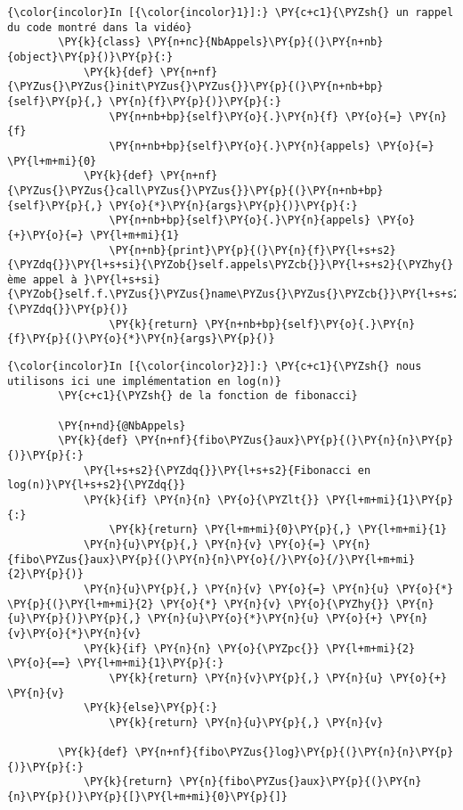     \begin{Verbatim}[commandchars=\\\{\},frame=single,framerule=0.3mm,rulecolor=\color{cellframecolor}]
{\color{incolor}In [{\color{incolor}1}]:} \PY{c+c1}{\PYZsh{} un rappel du code montré dans la vidéo}
        \PY{k}{class} \PY{n+nc}{NbAppels}\PY{p}{(}\PY{n+nb}{object}\PY{p}{)}\PY{p}{:}
            \PY{k}{def} \PY{n+nf}{\PYZus{}\PYZus{}init\PYZus{}\PYZus{}}\PY{p}{(}\PY{n+nb+bp}{self}\PY{p}{,} \PY{n}{f}\PY{p}{)}\PY{p}{:}
                \PY{n+nb+bp}{self}\PY{o}{.}\PY{n}{f} \PY{o}{=} \PY{n}{f}
                \PY{n+nb+bp}{self}\PY{o}{.}\PY{n}{appels} \PY{o}{=} \PY{l+m+mi}{0}
            \PY{k}{def} \PY{n+nf}{\PYZus{}\PYZus{}call\PYZus{}\PYZus{}}\PY{p}{(}\PY{n+nb+bp}{self}\PY{p}{,} \PY{o}{*}\PY{n}{args}\PY{p}{)}\PY{p}{:}
                \PY{n+nb+bp}{self}\PY{o}{.}\PY{n}{appels} \PY{o}{+}\PY{o}{=} \PY{l+m+mi}{1}
                \PY{n+nb}{print}\PY{p}{(}\PY{n}{f}\PY{l+s+s2}{\PYZdq{}}\PY{l+s+si}{\PYZob{}self.appels\PYZcb{}}\PY{l+s+s2}{\PYZhy{}ème appel à }\PY{l+s+si}{\PYZob{}self.f.\PYZus{}\PYZus{}name\PYZus{}\PYZus{}\PYZcb{}}\PY{l+s+s2}{\PYZdq{}}\PY{p}{)}
                \PY{k}{return} \PY{n+nb+bp}{self}\PY{o}{.}\PY{n}{f}\PY{p}{(}\PY{o}{*}\PY{n}{args}\PY{p}{)}
\end{Verbatim}


    \begin{Verbatim}[commandchars=\\\{\},frame=single,framerule=0.3mm,rulecolor=\color{cellframecolor}]
{\color{incolor}In [{\color{incolor}2}]:} \PY{c+c1}{\PYZsh{} nous utilisons ici une implémentation en log(n)}
        \PY{c+c1}{\PYZsh{} de la fonction de fibonacci}
        
        \PY{n+nd}{@NbAppels}
        \PY{k}{def} \PY{n+nf}{fibo\PYZus{}aux}\PY{p}{(}\PY{n}{n}\PY{p}{)}\PY{p}{:}
            \PY{l+s+s2}{\PYZdq{}}\PY{l+s+s2}{Fibonacci en log(n)}\PY{l+s+s2}{\PYZdq{}}
            \PY{k}{if} \PY{n}{n} \PY{o}{\PYZlt{}} \PY{l+m+mi}{1}\PY{p}{:}
                \PY{k}{return} \PY{l+m+mi}{0}\PY{p}{,} \PY{l+m+mi}{1}
            \PY{n}{u}\PY{p}{,} \PY{n}{v} \PY{o}{=} \PY{n}{fibo\PYZus{}aux}\PY{p}{(}\PY{n}{n}\PY{o}{/}\PY{o}{/}\PY{l+m+mi}{2}\PY{p}{)}
            \PY{n}{u}\PY{p}{,} \PY{n}{v} \PY{o}{=} \PY{n}{u} \PY{o}{*} \PY{p}{(}\PY{l+m+mi}{2} \PY{o}{*} \PY{n}{v} \PY{o}{\PYZhy{}} \PY{n}{u}\PY{p}{)}\PY{p}{,} \PY{n}{u}\PY{o}{*}\PY{n}{u} \PY{o}{+} \PY{n}{v}\PY{o}{*}\PY{n}{v}
            \PY{k}{if} \PY{n}{n} \PY{o}{\PYZpc{}} \PY{l+m+mi}{2} \PY{o}{==} \PY{l+m+mi}{1}\PY{p}{:}
                \PY{k}{return} \PY{n}{v}\PY{p}{,} \PY{n}{u} \PY{o}{+} \PY{n}{v}
            \PY{k}{else}\PY{p}{:}
                \PY{k}{return} \PY{n}{u}\PY{p}{,} \PY{n}{v}
        
        \PY{k}{def} \PY{n+nf}{fibo\PYZus{}log}\PY{p}{(}\PY{n}{n}\PY{p}{)}\PY{p}{:}
            \PY{k}{return} \PY{n}{fibo\PYZus{}aux}\PY{p}{(}\PY{n}{n}\PY{p}{)}\PY{p}{[}\PY{l+m+mi}{0}\PY{p}{]}
\end{Verbatim}


